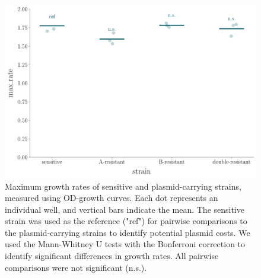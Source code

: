 \clearpage
\begin{figure}
  \centering
  \includegraphics[width=\linewidth]{chapter_2_sup/figures/plasmid_costs.pdf}
  \caption{
    Maximum growth rates of sensitive and plasmid-carrying strains, measured using OD-growth curves.
    Each dot represents an individual well, and vertical bars indicate the mean.
    The sensitive strain was used as the reference ("ref") for pairwise comparisons to the plasmid-carrying strains to identify potential plasmid costs.
    We used the Mann-Whitney U tests with the Bonferroni correction to identify significant differences in growth rates. All pairwise comparisons were not significant (n.s.).
  }
  \label{fig:plasmid_costs}
\end{figure}

